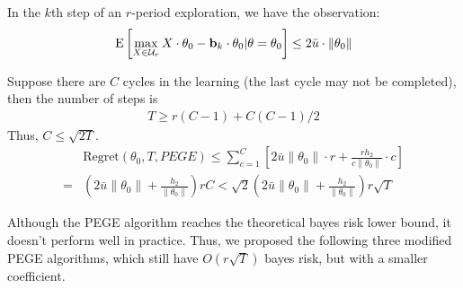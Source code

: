 \documentclass{article}
\theoremstyle{plain}
\theoremstyle{definition}
\begin{document}
In the $k$th step of an $r$-period exploration, we have the observation:
\[\text{E}\left[\max_{X\in\mathcal{U}_r} X\cdot \theta_0 - \bold{b}_k\cdot\theta_0 | \theta = \theta_0\right]\leq 2\bar{u}\cdot\|\theta_0\|\]


Suppose there are $C$ cycles in the learning (the last cycle may not be completed), then the number of steps is
\begin{align}
T \geq r(C-1) + {C(C-1)}/{2}\label{TC:PEGE}
\end{align}
Thus, $C\leq \sqrt{2T}$.
\begin{align}
&\text{Regret}(\theta_0, T, PEGE)\leq  \sum_{c=1}^{C}\left[2\bar{u}\|\theta_0\| \cdot r + \frac{rh_2}{c\|\theta_0\|}\cdot c\right] \nonumber\\
= & (2\bar{u}\|\theta_0\|+\frac{h_2}{\|\theta_0\|})rC
<  \sqrt{2}(2\bar{u}\|\theta_0\|+\frac{h_2}{\|\theta_0\|})r\sqrt{T} \label{reg:PEGE}
\end{align}

Although the PEGE algorithm reaches the theoretical bayes risk lower bound, it doesn't perform well in practice. Thus, we proposed the following three modified PEGE algorithms, which still have $O(r\sqrt{T})$ bayes risk, but with a smaller coefficient.

\end{document}
